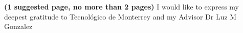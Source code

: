 \textbf{(1 suggested page,  no more than 2 pages)} I would like to express my deepest gratitude to 
Tecnol\'{o}gico de Monterrey and my Advisor Dr Luz M Gonzalez